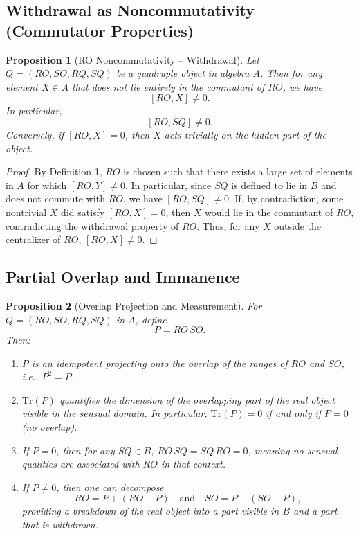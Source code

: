 \documentclass[12pt]{article}
\newtheorem{proposition}{Proposition}[section]
\begin{document}
\subsection{Withdrawal as Noncommutativity (Commutator Properties)}

\begin{proposition}[RO Noncommutativity -- Withdrawal]
Let $Q=(RO, SO, RQ, SQ)$ be a quadruple object in algebra $A$. Then for any element $X \in A$ that does \emph{not} lie entirely in the commutant of $RO$, we have
\[
[RO, X] \neq 0.
\]
In particular, 
\[
[RO, SQ] \neq 0.
\]
Conversely, if $[RO, X] = 0$, then $X$ acts trivially on the hidden part of the object.
\end{proposition}

\begin{proof}
By Definition 1, $RO$ is chosen such that there exists a large set of elements in $A$ for which $[RO, Y] \neq 0$. In particular, since $SQ$ is defined to lie in $B$ and does not commute with $RO$, we have $[RO, SQ] \neq 0$. If, by contradiction, some nontrivial $X$ did satisfy $[RO, X]=0$, then $X$ would lie in the commutant of $RO$, contradicting the withdrawal property of $RO$. Thus, for any $X$ outside the centralizer of $RO$, $[RO, X] \neq 0$.
\end{proof}

\subsection{Partial Overlap and Immanence}

\begin{proposition}[Overlap Projection and Measurement]
For $Q=(RO, SO, RQ, SQ)$ in $A$, define 
\[
P = RO\,SO.
\]
Then:
\begin{enumerate}
    \item $P$ is an idempotent projecting onto the overlap of the ranges of $RO$ and $SO$, i.e., $P^2 = P$.
    \item $\mathrm{Tr}(P)$ quantifies the dimension of the overlapping part of the real object visible in the sensual domain. In particular, $\mathrm{Tr}(P) = 0$ if and only if $P=0$ (no overlap).
    \item If $P=0$, then for any $SQ \in B$, $RO\,SQ = SQ\,RO = 0$, meaning no sensual qualities are associated with $RO$ in that context.
    \item If $P \neq 0$, then one can decompose 
    \[
    RO = P + (RO-P) \quad \text{and} \quad SO = P + (SO-P),
    \]
    providing a breakdown of the real object into a part visible in $B$ and a part that is withdrawn.
\end{enumerate}
\end{proposition}
\end{document}
